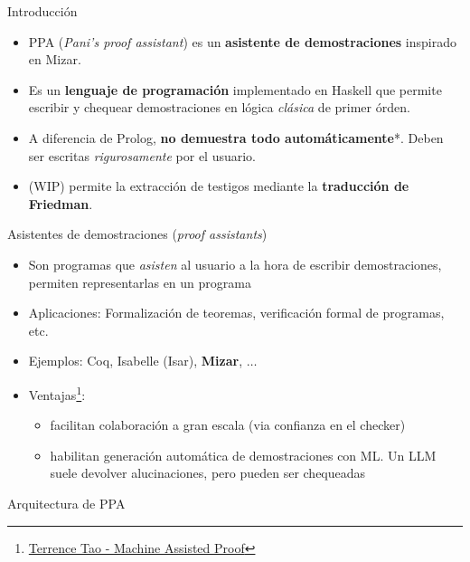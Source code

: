 \documentclass[xcolor={dvipsnames},spanish]{beamer}
\begin{document}
\begin{frame}{Introducción}
    \begin{itemize}
        \item PPA (\textit{Pani's proof assistant}) es un \textbf{asistente de demostraciones} inspirado en Mizar.
        \item Es un \textbf{lenguaje de programación} implementado en Haskell que permite escribir y chequear demostraciones en lógica \textit{clásica} de primer órden.
        \item A diferencia de Prolog, \textbf{no demuestra todo automáticamente}*. Deben ser escritas \textit{rigurosamente} por el usuario.
        \item (WIP) permite la extracción de testigos mediante la \textbf{traducción de Friedman}.
    \end{itemize}
\end{frame}

\begin{frame}{Asistentes de demostraciones (\textit{proof assistants})}
    \begin{itemize}
        \item Son programas que \textit{asisten} al usuario a la hora de escribir demostraciones, permiten representarlas en un programa
        \item Aplicaciones: Formalización de teoremas, verificación formal de programas, etc.
        \item Ejemplos: Coq, Isabelle (Isar), \textbf{Mizar}, $\dots$
        \item Ventajas\footnote{\href{https://youtu.be/AayZuuDDKP0?si=eGETzgh9PQ_8JecR}{Terrence Tao - Machine Assisted Proof}}:
        \begin{itemize}
            \item facilitan colaboración a gran escala (via confianza en el checker)
            \item habilitan generación automática de demostraciones con ML. Un LLM suele devolver alucinaciones, pero pueden ser chequeadas
        \end{itemize}
        
    \end{itemize}
\end{frame}



\begin{frame}{Arquitectura de PPA}

\begin{figure}
    \centering
\end{figure}

\end{frame}
\end{document}
